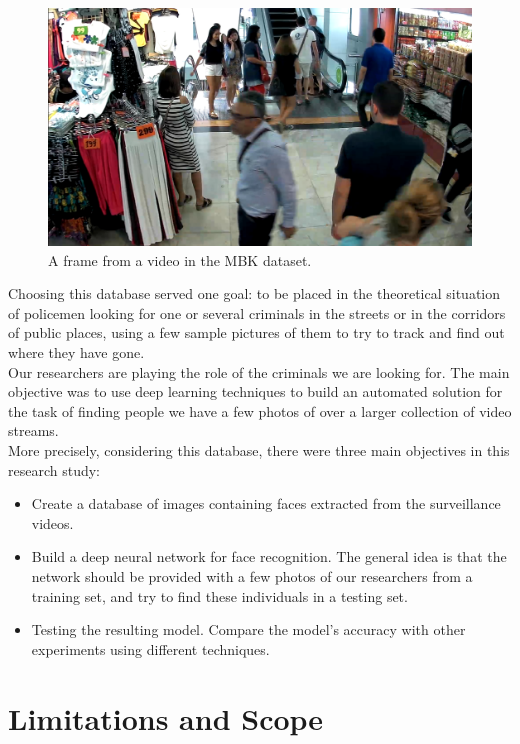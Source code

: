\begin{figure}[t]
  \centering
  \includegraphics[scale=0.3]{figures/database.png}  
  \caption[A frame from a video in the MBK dataset.]{A frame from a video in the MBK dataset.}
  \label{fig:example}
\end{figure}

Choosing this database served one goal: to be placed in the theoretical situation of policemen looking for one or several criminals in the streets or in the corridors of public places, using a few sample pictures of them to try to track and find out where they have gone.\\

Our researchers are playing the role of the criminals we are looking for.
The main objective was to use deep learning techniques to build an automated solution for the task of finding people we have a few photos of over a larger collection of video streams.\\

More precisely, considering this database, there were three main objectives in this research study:
\begin{itemize}
\item Create a database of images containing faces extracted from the surveillance videos.
\item Build a deep neural network for face recognition. The general idea is that the network should be provided with a few photos of our researchers from a training set, and try to find these individuals in a testing set.
\item Testing the resulting model. Compare the model's accuracy with other experiments using different techniques.
\end{itemize}

\section{Limitations and Scope}

